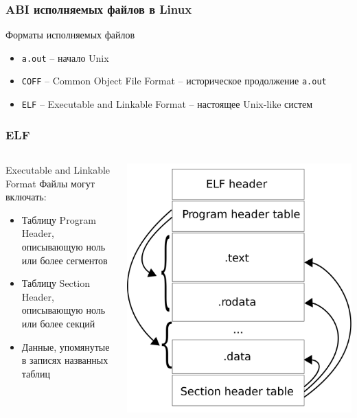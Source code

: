 
\begin{frame}
	\frametitle{ABI исполняемых файлов в Linux}

	\begin{block}{Форматы исполняемых файлов}
		\begin{itemize}
			\item {\tt a.out} -- начало Unix
			\item {\tt COFF} -- Common Object File Format -- историческое продолжение {\tt a.out}
			\item {\tt ELF} -- Executable and Linkable Format -- настоящее Unix-like систем
		\end{itemize}
	\end{block}
\end{frame}

\begin{frame}
	\frametitle{ELF}
	\begin{columns}
			\begin{block}{Executable and Linkable Format}
				Файлы могут включать:
				\begin{itemize}
					\item Таблицу Program Header,  описывающую ноль или более сегментов
					\item Таблицу Section Header,  описывающую ноль или более секций
					\item Данные,  упомянутые в записях названных таблиц
				\end{itemize}
			\end{block}
			\includegraphics[height=0.8\textheight]{../../slides/elf-analysis/Elf-layout.png}
	\end{columns}
\end{frame}

